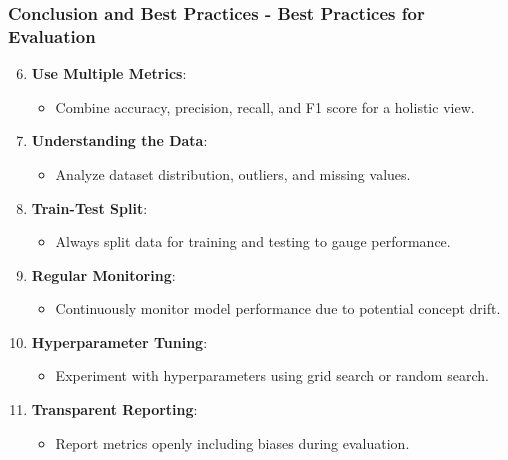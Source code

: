 \documentclass{beamer}
\begin{document}
\begin{frame}[fragile]
    \frametitle{Conclusion and Best Practices - Best Practices for Evaluation}
    
    \begin{enumerate}
        \setcounter{enumi}{5} %
        \item \textbf{Use Multiple Metrics}:
        \begin{itemize}
            \item Combine accuracy, precision, recall, and F1 score for a holistic view.
        \end{itemize}

        \item \textbf{Understanding the Data}:
        \begin{itemize}
            \item Analyze dataset distribution, outliers, and missing values.
        \end{itemize}

        \item \textbf{Train-Test Split}:
        \begin{itemize}
            \item Always split data for training and testing to gauge performance.
        \end{itemize}

        \item \textbf{Regular Monitoring}:
        \begin{itemize}
            \item Continuously monitor model performance due to potential concept drift.
        \end{itemize}

        \item \textbf{Hyperparameter Tuning}:
        \begin{itemize}
            \item Experiment with hyperparameters using grid search or random search.
        \end{itemize}

        \item \textbf{Transparent Reporting}:
        \begin{itemize}
            \item Report metrics openly including biases during evaluation.
        \end{itemize}
    \end{enumerate}
\end{frame}
\end{document}
